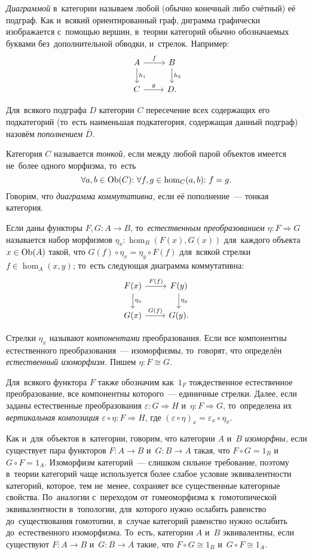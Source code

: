 \documentclass[a4paper,oneside]{article}
\begin{document}
\textit{Диаграммой} в~категории называем любой (обычно конечный либо счётный) её подграф.
Как и~всякий ориентированный граф, диграмма графически изображается с~помощью вершин,
в~теории категорий обычно обозначаемых буквами без~дополнительной обводки, и~стрелок.
Например:
\[
    \begin{tikzcd}
        \arrow{d}{h_1} A \arrow{r}{f} & B \arrow{d}{h_2} \\
                       C \arrow{r}{g} & D.
    \end{tikzcd}
\]

Для~всякого подграфа $D$ категории $C$ пересечение всех содержащих его подкатегорий
(то~есть наименьшая подкатегория, содержащая данный подграф) назовём \textit{пополнением} $\overline{D}$.

Категория $C$ называется \textit{тонкой,} если между любой парой объектов имеется не~более одного морфизма,
то~есть $$\forall a, b \in \mathrm{Ob}(C){:}\ \forall f, g \in \hom_C(a, b){:}\ f = g.$$
Говорим, что \textit{диаграмма коммутативна,} если её пополнение~— тонкая категория.

Если даны функторы $F, G : A \rightarrow B$, то~\textit{естественным преобразованием} $\eta : F \Rightarrow G$ называется набор морфизмов
$\eta_x : \hom_B(F(x), G(x))$ для~каждого объекта $x \in \mathrm{Ob}(A)$ такой, что $G(f) \circ \eta_x = \eta_y \circ F(f)$
для~всякой стрелки $f \in \hom_A(x, y)$; то~есть следующая диаграмма коммутативна:
\[
  \begin{tikzcd}
    \arrow{d}{\eta_x} F(x) \arrow{r}{F(f)} & F(y) \arrow{d}{\eta_y} \\
                      G(x) \arrow{r}{G(f)} & G(y).
  \end{tikzcd}
\]

Стрелки $\eta_x$ называют \textit{компонентами} преобразования. Если все компонентны естественного
преобразования~— изоморфизмы, то~говорят, что определён \textit{естественный изоморфизм.} Пишем $\eta : F \cong G$.

Для~всякого функтора $F$ также обозначим как~$1_F$ тождественное естественное преобразование, все компонентны которого~— единичные стрелки.
Далее, если заданы естественные преобразования $\varepsilon : G \Rightarrow H$ и~$\eta : F \Rightarrow G$,
то~определена их \textit{вертикальная композиция} $\varepsilon \circ \eta : F \Rightarrow H$,
где $(\varepsilon \circ \eta)_x = \varepsilon_x \circ \eta_x$.

Как и~для~объектов в~категории, говорим, что категории $A$ и~$B$ \textit{изоморфны,} если существует
пара функторов $F : A \rightarrow B$ и~$G : B \rightarrow A$ такая, что $F \circ G = 1_B$ и~$G \circ F = 1_A$.
Изоморфизм категорий~— слишком сильное требование, поэтому в~теории категорий чаще используется более слабое
условие эквивалентности категорий, которое, тем не~менее, сохраняет все существенные категорные свойства.
По~аналогии с~переходом от~гомеоморфизма к~гомотопической эквивалентности в~топологии, для~которого нужно ослабить
равенство до~существования гомотопии, в~случае категорий равенство нужно ослабить до~естественного изоморфизма.
То~есть, категории $A$ и~$B$ эквивалентны, если существуют $F : A \rightarrow B$ и~$G : B \rightarrow A$
такие, что $F \circ G \cong 1_B$ и~$G \circ F \cong 1_A$.
\end{document}
